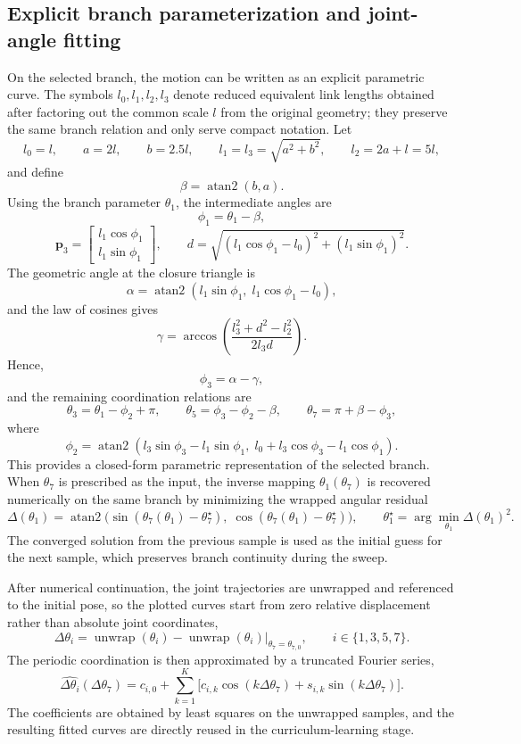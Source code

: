 ﻿\documentclass[a4paper,fleqn]{cas-sc}
\begin{document}
\subsection{Explicit branch parameterization and joint-angle fitting}

On the selected branch, the motion can be written as an explicit parametric curve. The symbols \(l_0,l_1,l_2,l_3\) denote reduced equivalent link lengths obtained after factoring out the common scale \(l\) from the original geometry; they preserve the same branch relation and only serve compact notation. Let
\[
l_0=l,\qquad a=2l,\qquad b=2.5l,\qquad
l_1=l_3=\sqrt{a^2+b^2},\qquad l_2=2a+l=5l,
\]
and define
\[
\beta=\operatorname{atan2}(b,a).
\]
Using the branch parameter \(\theta_1\), the intermediate angles are
\[
\phi_1=\theta_1-\beta,
\]
\[
\mathbf p_3=
\begin{bmatrix}
l_1\cos\phi_1\\
l_1\sin\phi_1
\end{bmatrix},
\qquad
d=\sqrt{(l_1\cos\phi_1-l_0)^2+(l_1\sin\phi_1)^2}.
\]
The geometric angle at the closure triangle is
\[
\alpha=\operatorname{atan2}\!\left(l_1\sin\phi_1,\;l_1\cos\phi_1-l_0\right),
\]
and the law of cosines gives
\[
\gamma=\arccos\!\left(
\frac{l_3^2+d^2-l_2^2}{2l_3d}
\right).
\]
Hence,
\[
\phi_3=\alpha-\gamma,
\]
and the remaining coordination relations are
\[
\theta_3=\theta_1-\phi_2+\pi,\qquad
\theta_5=\phi_3-\phi_2-\beta,\qquad
\theta_7=\pi+\beta-\phi_3,
\]
where
\[
\phi_2=
\operatorname{atan2}\!\left(
 l_3\sin\phi_3-l_1\sin\phi_1,\;
 l_0+l_3\cos\phi_3-l_1\cos\phi_1
\right).
\]
This provides a closed-form parametric representation of the selected
branch. When \(\theta_7\) is prescribed as the input, the inverse mapping
\(\theta_1(\theta_7)\) is recovered numerically on the same branch by
minimizing the wrapped angular residual
\[
\Delta(\theta_1)=
\operatorname{atan2}\!\Big(
\sin(\theta_7(\theta_1)-\theta_7^\star),\;
\cos(\theta_7(\theta_1)-\theta_7^\star)
\Big),
\qquad
\theta_1^\star=\arg\min_{\theta_1}\Delta(\theta_1)^2.
\]
The converged solution from the previous sample is used as the initial guess
for the next sample, which preserves branch continuity during the sweep.

After numerical continuation, the joint trajectories are unwrapped and referenced to the initial pose, so the plotted curves start from zero relative displacement rather than absolute joint coordinates,
\[
\Delta\theta_i=\operatorname{unwrap}(\theta_i)-
\operatorname{unwrap}(\theta_i)\big|_{\theta_7=\theta_{7,0}},
\qquad i\in\{1,3,5,7\}.
\]
The periodic coordination is then approximated by a truncated Fourier
series,
\[
\widehat{\Delta\theta_i}(\Delta\theta_7)=c_{i,0}+
\sum_{k=1}^{K}\Big[
 c_{i,k}\cos(k\Delta\theta_7)+s_{i,k}\sin(k\Delta\theta_7)
\Big].
\]
The coefficients are obtained by least squares on the unwrapped samples, and
the resulting fitted curves are directly reused in the curriculum-learning
stage.
\end{document}
